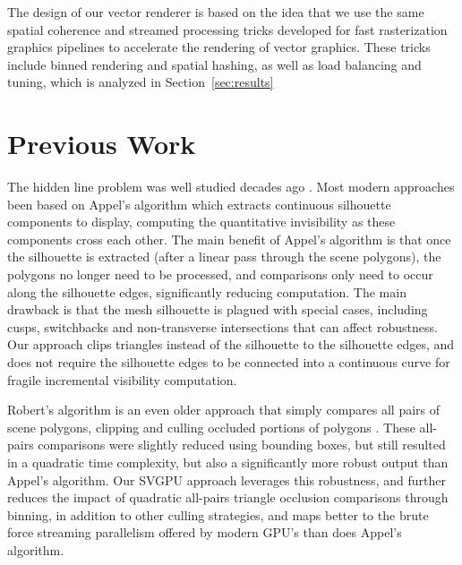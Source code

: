 \documentclass[review]{acmsiggraph}
\begin{document}
The design of our vector renderer is based on the idea that we use the same
spatial coherence and streamed processing tricks developed for fast
rasterization graphics pipelines to accelerate the rendering of vector
graphics. These tricks include binned rendering and spatial hashing, as well
as load balancing and tuning, which is analyzed in Section~\ref{sec:results}


\section{Previous Work}
The hidden line problem was well studied decades ago \cite{sutherland1974}.
Most modern approaches been based on Appel's algorithm \cite{appel1967} which
extracts continuous silhouette components to display, computing the
quantitative invisibility as these components cross each other.
The main benefit of Appel's algorithm is that once the silhouette is
extracted (after a linear pass through the scene polygons), the polygons no
longer need to be processed, and comparisons only need to occur along the
silhouette edges, significantly reducing computation. The main drawback is
that the mesh silhouette is plagued with special cases, including cusps,
switchbacks and non-transverse intersections that can affect robustness. Our
approach clips triangles instead of the silhouette to the silhouette edges,
and does not require the silhouette edges to be connected into a continuous
curve for fragile incremental visibility computation.

Robert's algorithm is an even older approach that simply compares all pairs of
scene polygons, clipping and culling occluded portions of polygons
\cite{roberts1963}. These all-pairs comparisons were slightly reduced 
using bounding boxes, but still resulted in a quadratic time complexity, but
also a significantly more robust output than Appel's algorithm. Our SVGPU
approach leverages this robustness, and further reduces the impact of
quadratic all-pairs triangle occlusion comparisons through binning, in
addition to other culling strategies, and maps better to the brute force
streaming parallelism offered by modern GPU's than does Appel's algorithm.
\end{document}
